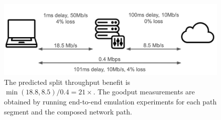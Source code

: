 \begin{figure}
    \centering
    \includegraphics[width=\linewidth]{figures/heuristic_example.jpg}
    \caption{The predicted split throughput benefit is $\min(18.8, 8.5)/0.4 =
     21\times$. The goodput measurements are obtained by running end-to-end
     emulation experiments for each path segment and the composed network
     path.}
    \label{fig:heuristic-example}
\end{figure}
